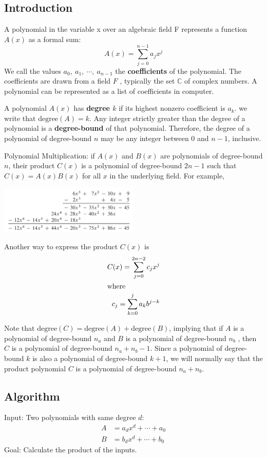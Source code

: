 \subsection{Introduction}
A polynomial in the variable x over an algebraic field F represents a function 
$A(x)$ as a formal sum:
\[A(x) = \sum_{j = 0}^{n-1} a_j x^j\]
We call the values $a_0, ~a_1, ~\cdots, ~a_{n-1}$ the \textbf{coefficients} of 
the polynomial. The coefficients are drawn from a field $F$ , typically the set 
$\mathbb{C}$ of complex numbers. A polynomial can be represented as a list of 
coefficients in computer.

A polynomial $A(x)$ has \textbf{degree $k$} if its highest nonzero coefficient 
is $a_k$. we write that $\text{degree}(A) = k$. Any integer strictly greater 
than the degree of a polynomial is a \textbf{degree-bound }of that polynomial. 
Therefore, the degree of a polynomial of degree-bound $n$ may be any integer 
between $0$ and $n-1$, inclusive.

Polynomial Multiplication: if $A(x)$ and $B(x)$ are polynomials of degree-bound 
$n$, their product $C(x)$ is a polynomial of degree-bound $2n - 1$ such that
$C(x) = A(x)B(x)$ for all $x$ in the underlying field. For example,

\centerline{\includegraphics[width=0.5\textwidth]{poly-multiply.png}}

Another way to express the product $C(x)$ is
\begin{align*}
 C(x) = \sum_{j=0}^{2n-2} c_j x^j\\
 \intertext{where}
 c_j = \sum_{k=0}^j a_k b^{j-k}
\end{align*}

Note that $\text{degree}(C) = \text{degree}(A) +  \text{degree}(B)$, implying 
that if $A$ is a polynomial of degree-bound $n_a$ and $B$ is a polynomial 
of degree-bound $n_b$ , then $C$ is a polynomial of degree-bound $n_a + n_b - 
1$. Since a polynomial of degree-bound $k$ is also a polynomial of degree-bound 
$k + 1$, we will normally say that the product polynomial $C$ is a polynomial 
of degree-bound $n_a + n_b$.

\subsection{Algorithm}
Input: Two polynomials with same degree $d$:
\begin{align*}
 A &= a_d x^d + \cdots + a_0\\
 B &= b_d x^d + \cdots + b_0
\end{align*}
Goal: Calculate the product of the inputs.

